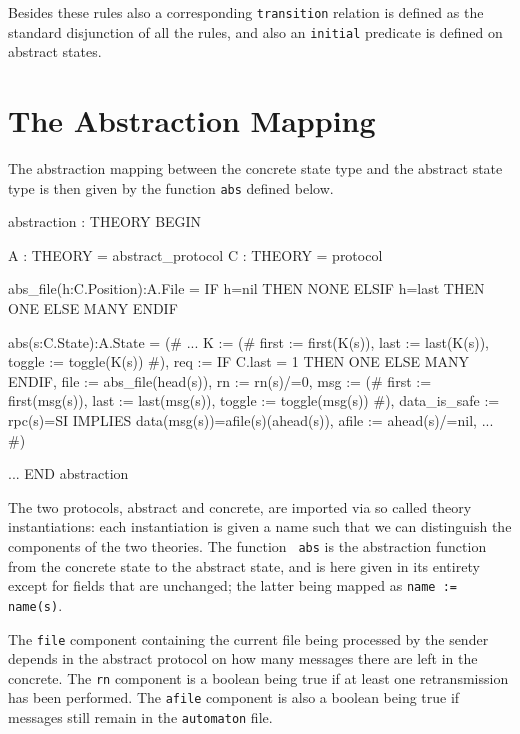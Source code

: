 Besides these rules also a corresponding {\tt transition} relation is
defined as the standard disjunction of all the rules, and also an 
{\tt initial} predicate is defined on abstract states.


\section{The Abstraction Mapping}

The abstraction mapping between the concrete state type and
the abstract state type is then given by the function {\tt abs}
defined below.

\begin{smallsession}
  abstraction : THEORY
  BEGIN

    A  : THEORY = abstract_protocol
    C  : THEORY = protocol

    abs_file(h:C.Position):A.File =
      IF h=nil THEN
        NONE
      ELSIF h=last THEN
        ONE
      ELSE
        MANY
      ENDIF

    abs(s:C.State):A.State =
      (#  ...
          K               := (# first  := first(K(s)),
                                last   := last(K(s)),
                                toggle := toggle(K(s)) #),
          req             := IF C.last = 1 THEN ONE ELSE MANY ENDIF,
          file            := abs_file(head(s)),
          rn              := rn(s)/=0,
          msg             := (# first  := first(msg(s)),
                                last   := last(msg(s)),
                                toggle := toggle(msg(s)) #), 
          data_is_safe    := rpc(s)=SI IMPLIES 
                               data(msg(s))=afile(s)(ahead(s)),
          afile           := ahead(s)/=nil,
          ...
      #)

    ...
  END abstraction
\end{smallsession}

The  two protocols, abstract and   concrete, are imported via so called
theory instantiations: each instantiation is given a name such that we
can distinguish the components of the two  theories. The function {\tt
abs}  is  the  abstraction function from   the concrete  state to  the
abstract state,  and is here given  in its entirety except  for fields
that are unchanged; the latter being mapped as  {\tt name := name(s)}.

The  {\tt file} component containing  the current file being processed
by the sender depends  in the abstract  protocol on how many  messages
there  are left in  the concrete. The {\tt  rn} component is a boolean
being true if  at least  one  retransmission has  been performed.  The
{\tt  afile} component is also a  boolean being true if messages still
remain in the {\tt automaton} file.

